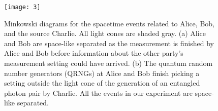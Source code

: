 \documentclass[aps,prl,twocolumn,amsmath,amssymb,nofootinbib,superscriptaddress]{revtex4-1}
\begin{document}



\begin{figure}[t]
\texttt{[image: 3]}
\caption{Minkowski diagrams for the spacetime events related to Alice, Bob, and the source Charlie. All light cones are shaded gray.  (a) Alice and Bob are space-like separated as the measurement is finished by Alice and Bob before information about the other party's measurement setting could have arrived. (b) The quantum random number generators (QRNGs) at Alice and Bob finish picking a setting outside the light cone of the generation of an entangled photon pair by Charlie. All the events in our experiment are space-like separated.} \label{fig:3}
\end{figure}


\end{document}

